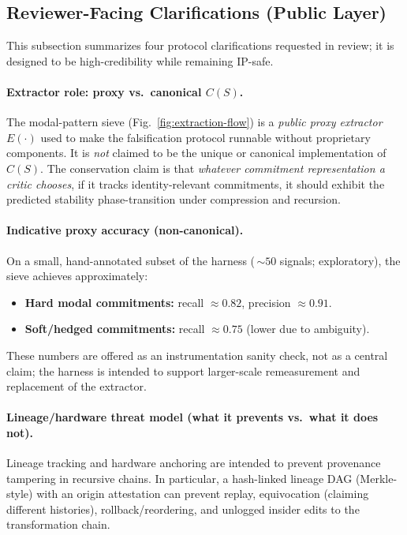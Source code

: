 \documentclass[11pt,a4paper]{article}
\begin{document}
\subsection{Reviewer-Facing Clarifications (Public Layer)}
\label{sec:reviewer-clarifications}

This subsection summarizes four protocol clarifications requested in review; it is designed to be high-credibility while remaining IP-safe.

\paragraph{Extractor role: proxy vs.\ canonical $C(S)$.}
The modal-pattern sieve (Fig.~\ref{fig:extraction-flow}) is a \emph{public proxy extractor} $E(\cdot)$ used to make the falsification protocol runnable without proprietary components. It is \emph{not} claimed to be the unique or canonical implementation of $C(S)$. The conservation claim is that \emph{whatever commitment representation a critic chooses}, if it tracks identity-relevant commitments, it should exhibit the predicted stability phase-transition under compression and recursion.

\paragraph{Indicative proxy accuracy (non-canonical).}
On a small, hand-annotated subset of the harness (\,$\sim 50$ signals; exploratory), the sieve achieves approximately:
\begin{itemize}
    \item \textbf{Hard modal commitments:} recall $\approx 0.82$, precision $\approx 0.91$.
    \item \textbf{Soft/hedged commitments:} recall $\approx 0.75$ (lower due to ambiguity).
\end{itemize}
These numbers are offered as an instrumentation sanity check, not as a central claim; the harness is intended to support larger-scale remeasurement and replacement of the extractor.

\paragraph{Lineage/hardware threat model (what it prevents vs.\ what it does not).}
Lineage tracking and hardware anchoring are intended to prevent provenance tampering in recursive chains. In particular, a hash-linked lineage DAG (Merkle-style) with an origin attestation can prevent replay, equivocation (claiming different histories), rollback/reordering, and unlogged insider edits to the transformation chain.
\end{document}
